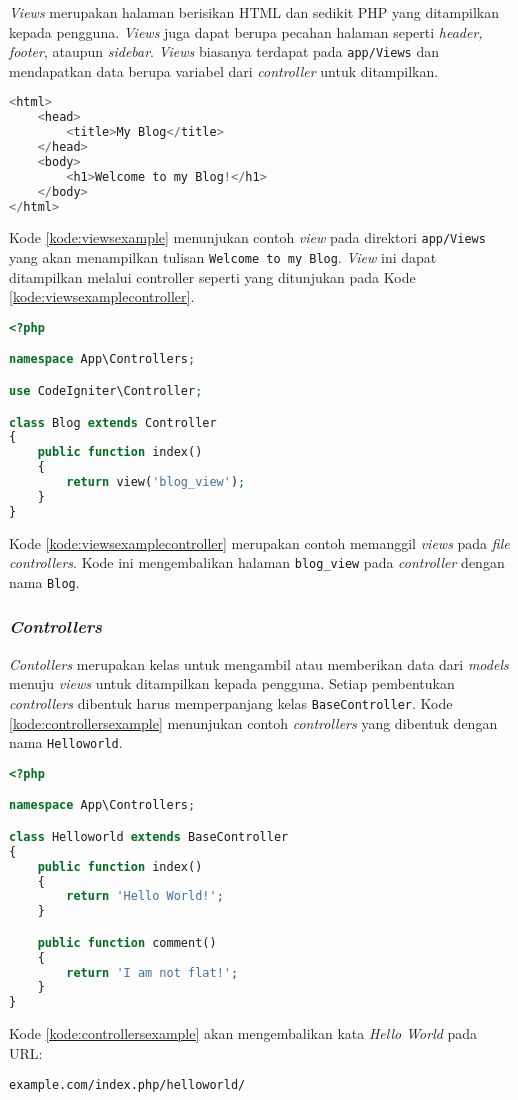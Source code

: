 \textit{Views} merupakan halaman berisikan HTML dan sedikit PHP yang ditampilkan kepada pengguna. \textit{Views} juga dapat berupa pecahan halaman seperti \textit{header, footer}, ataupun \textit{sidebar}. \textit{Views} biasanya terdapat pada \verb|app/Views| dan mendapatkan data berupa variabel dari \textit{controller} untuk ditampilkan.

\begin{lstlisting}[language=PHP, caption=Contoh \textit{Views} pada \textit{CodeIgniter 4},label=kode:viewsexample]
<html>
    <head>
        <title>My Blog</title>
    </head>
    <body>
        <h1>Welcome to my Blog!</h1>
    </body>
</html>
\end{lstlisting}

Kode \ref{kode:viewsexample} menunjukan contoh \textit{view} pada direktori \verb|app/Views| yang akan menampilkan tulisan \texttt{Welcome to my Blog}. \textit{View} ini dapat ditampilkan melalui controller seperti yang ditunjukan pada Kode \ref{kode:viewsexamplecontroller}.
\begin{lstlisting}[language=PHP, caption=Contoh menampilkan \textit{Views} pada \textit{controller},label=kode:viewsexamplecontroller]
<?php

namespace App\Controllers;

use CodeIgniter\Controller;

class Blog extends Controller
{
    public function index()
    {
        return view('blog_view');
    }
}
\end{lstlisting}

Kode \ref{kode:viewsexamplecontroller} merupakan contoh memanggil \textit{views} pada \textit{file controllers}. Kode ini mengembalikan halaman \texttt{blog\_view} pada \textit{controller} dengan nama \texttt{Blog}.

\subsubsection{\textit{Controllers}}

\textit{Contollers} merupakan kelas untuk mengambil atau memberikan data dari \textit{models} menuju \textit{views} untuk ditampilkan kepada pengguna. Setiap pembentukan \textit{controllers} dibentuk harus memperpanjang kelas \texttt{BaseController}. Kode \ref{kode:controllersexample} menunjukan contoh \textit{controllers} yang dibentuk dengan nama \texttt{Helloworld}.

\begin{lstlisting}[language=PHP, caption=Contoh \textit{Controllers} pada \textit{CodeIgniter 4},label=kode:controllersexample]
<?php

namespace App\Controllers;

class Helloworld extends BaseController
{
    public function index()
    {
        return 'Hello World!';
    }

    public function comment()
    {
        return 'I am not flat!';
    }
}
\end{lstlisting}
Kode \ref{kode:controllersexample} akan mengembalikan kata \textit{Hello World} pada URL:
\begin{center}
\verb|example.com/index.php/helloworld/|
\end{center}

